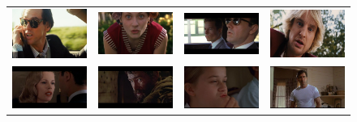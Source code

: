 \begin{figure}
\begin{center}
\begin{tabular}{cccc}
\includegraphics[width=0.15\linewidth]
  {fig/close-ups/01.jpg} 
& \includegraphics[width=0.15\linewidth]
  {fig/close-ups/02.jpg}  
& \includegraphics[width=0.15\linewidth]
  {fig/close-ups/10.jpg}   
& \includegraphics[width=0.15\linewidth]
  {fig/close-ups/15.jpg}
\\
\includegraphics[width=0.15\linewidth]
  {fig/close-ups/05.jpg} 
& \includegraphics[width=0.15\linewidth]
  {fig/close-ups/06.jpg}  
& \includegraphics[width=0.15\linewidth]
  {fig/close-ups/07.jpg}   
& \includegraphics[width=0.15\linewidth]
  {fig/close-ups/08.jpg}
\\


\end{tabular}
\end{center}
\end{figure}

